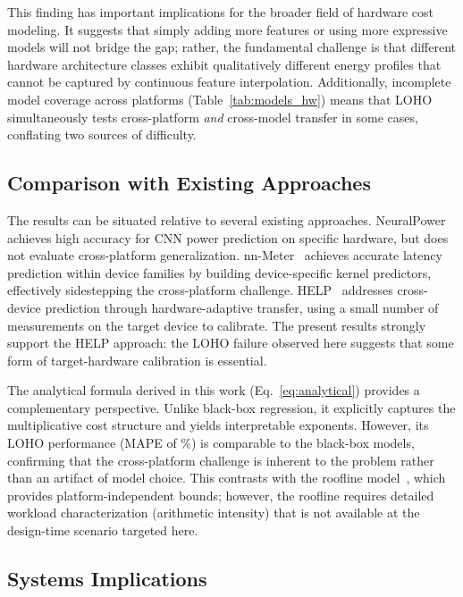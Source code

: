 \documentclass[review,12pt,authoryear]{elsarticle}
\begin{document}
This finding has important implications for the broader field of hardware cost modeling.
It suggests that simply adding more features or using more expressive models will not bridge the gap; rather, the fundamental challenge is that different hardware architecture classes exhibit qualitatively different energy profiles that cannot be captured by continuous feature interpolation.
Additionally, incomplete model coverage across platforms (Table~\ref{tab:models_hw}) means that LOHO simultaneously tests cross-platform \emph{and} cross-model transfer in some cases, conflating two sources of difficulty.

\subsection{Comparison with Existing Approaches}
\label{sec:discussion_comparison}

The results can be situated relative to several existing approaches.
NeuralPower~\citep{cai2017neuralpower} achieves high accuracy for CNN power prediction on specific hardware, but does not evaluate cross-platform generalization.
nn-Meter~\citep{zhang2021nnmeter} achieves accurate latency prediction within device families by building device-specific kernel predictors, effectively sidestepping the cross-platform challenge.
HELP~\citep{lee2021help} addresses cross-device prediction through hardware-adaptive transfer, using a small number of measurements on the target device to calibrate.
The present results strongly support the HELP approach: the LOHO failure observed here suggests that some form of target-hardware calibration is essential.

The analytical formula derived in this work (Eq.~\ref{eq:analytical}) provides a complementary perspective.
Unlike black-box regression, it explicitly captures the multiplicative cost structure and yields interpretable exponents.
However, its LOHO performance (MAPE of \unskip\%) is comparable to the black-box models, confirming that the cross-platform challenge is inherent to the problem rather than an artifact of model choice.
This contrasts with the roofline model~\citep{williams2009roofline}, which provides platform-independent bounds; however, the roofline requires detailed workload characterization (arithmetic intensity) that is not available at the design-time scenario targeted here.

\subsection{Systems Implications}
\label{sec:discussion_systems}
\end{document}
